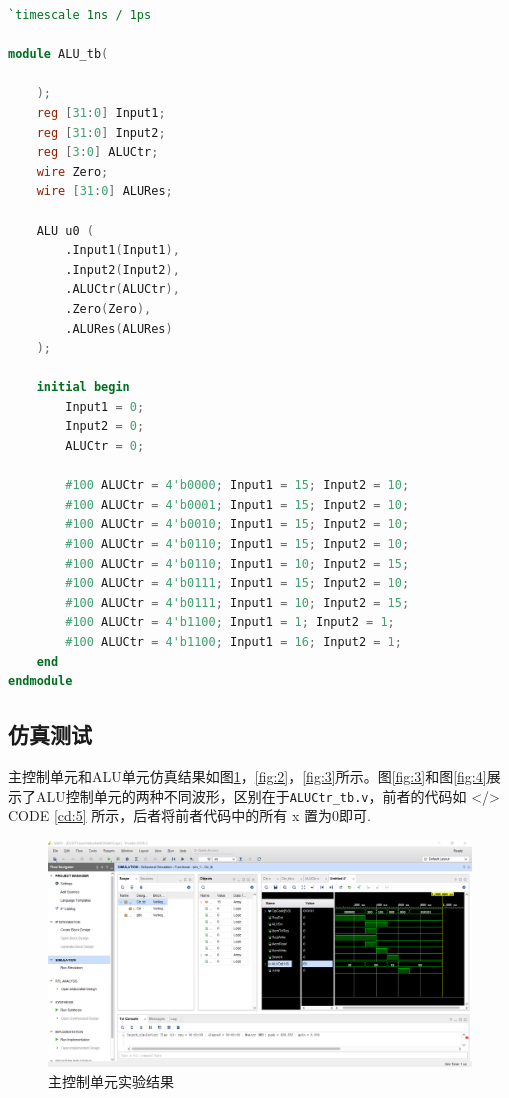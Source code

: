 \documentclass{progartcn}
\begin{document}
\begin{lstlisting}[language=verilog,caption={ALU\_tb.v},label={cd:6}]
`timescale 1ns / 1ps

module ALU_tb(

    );
    reg [31:0] Input1;
    reg [31:0] Input2;
    reg [3:0] ALUCtr;
    wire Zero;
    wire [31:0] ALURes;
    
    ALU u0 (
        .Input1(Input1),
        .Input2(Input2),
        .ALUCtr(ALUCtr),
        .Zero(Zero),
        .ALURes(ALURes)
    );
    
    initial begin
        Input1 = 0;
        Input2 = 0;
        ALUCtr = 0;
        
        #100 ALUCtr = 4'b0000; Input1 = 15; Input2 = 10;
        #100 ALUCtr = 4'b0001; Input1 = 15; Input2 = 10;
        #100 ALUCtr = 4'b0010; Input1 = 15; Input2 = 10;
        #100 ALUCtr = 4'b0110; Input1 = 15; Input2 = 10;
        #100 ALUCtr = 4'b0110; Input1 = 10; Input2 = 15;
        #100 ALUCtr = 4'b0111; Input1 = 15; Input2 = 10;
        #100 ALUCtr = 4'b0111; Input1 = 10; Input2 = 15;
        #100 ALUCtr = 4'b1100; Input1 = 1; Input2 = 1;
        #100 ALUCtr = 4'b1100; Input1 = 16; Input2 = 1;
    end
endmodule
\end{lstlisting}

\subsection{仿真测试}

主控制单元和ALU单元仿真结果如图\ref{fig:1}，\ref{fig:2}，\ref{fig:3}所示。图\ref{fig:3}和图\ref{fig:4}展示了ALU控制单元的两种不同波形，区别在于\verb|ALUCtr_tb.v|，前者的代码如 </> CODE \ref{cd:5} 所示，后者将前者代码中的所有 x 置为0即可.

\begin{figure}[htbp]
    \centering
    \includegraphics[scale=0.3]{../figure/03/lab03-1.PNG}
    \caption{主控制单元实验结果}\label{fig:1}
\end{figure}
\end{document}
